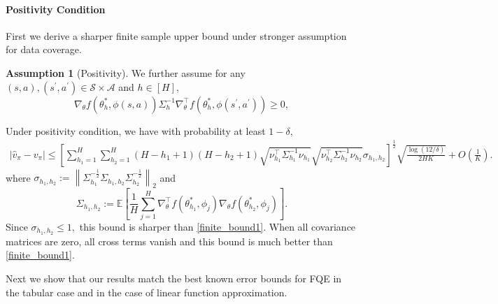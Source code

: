 \documentclass{article}
\numberwithin{equation}{section}
\theoremstyle{plain}
\theoremstyle{definition}
\newtheorem{assumption}[theorem]{Assumption}
\theoremstyle{remark}
\begin{document}
\paragraph{Positivity Condition} First we derive a sharper finite sample upper bound under stronger assumption for data coverage. 
\begin{assumption}[Positivity]\label{assumption_positivity}
    We further assume for any $(s,a),(s^{\prime},a^{\prime}) \in \mathcal{S} \times \mathcal{A}$ and $h \in [H],$
    $$
    \nabla_{\theta} f(\theta_h^*,\phi(s,a)) \Sigma_h^{-1} \nabla_{\theta}^{\top} f(\theta_h^*,\phi(s^{\prime},a^{\prime})) \geq 0,
    $$
\end{assumption}
Under positivity condition, we have with probability at least $1-\delta,$
\begin{align*}
    \left|\widehat{v}_{\pi} - v_{\pi}\right| \leq \left[\sum_{h_{1}=1}^{H} \sum_{h_{2}=1}^{H}\left(H-h_{1}+1\right)\left(H-h_{2}+1\right) \sqrt{\nu_{h_{1}}^{\top} \Sigma_{h_{1}}^{-1} \nu_{h_{1}}} \sqrt{\nu_{h_{2}}^{\top} \Sigma_{h_{2}}^{-1} \nu_{h_{2}} } \sigma_{h_{1}, h_{2}} \right]^{\frac{1}{2}} \sqrt{\frac{\log (12 / \delta)}{2 H K}} + O(\frac{1}{K}).
\end{align*}
where $\sigma_{h_{1}, h_{2}}:=\left\|\Sigma_{h_{1}}^{-\frac{1}{2}} \Sigma_{h_{1}, h_{2}} \Sigma_{h_{2}}^{-\frac{1}{2}}\right\|_{2}$ and
\begin{equation*}
    \Sigma_{h_{1}, h_{2}}:=\mathbb{E}\left[\frac{1}{H} \sum_{j=1}^{H} \nabla_{\theta}^{\top} f\left(\theta_{h_{1}}^*, \phi_j\right) \nabla_{\theta} f\left(\theta_{h_{2}}^*, \phi_j\right)\right].
\end{equation*}
Since $\sigma_{h_1,h_2} \leq 1,$ this bound is sharper than \eqref{finite_bound1}. When all covariance matrices are zero, all cross terms vanish and this bound is much better than \eqref{finite_bound1}.

Next we show that our results match the best known error bounds for FQE in the tabular case and in the case of linear function approximation.
\end{document}
